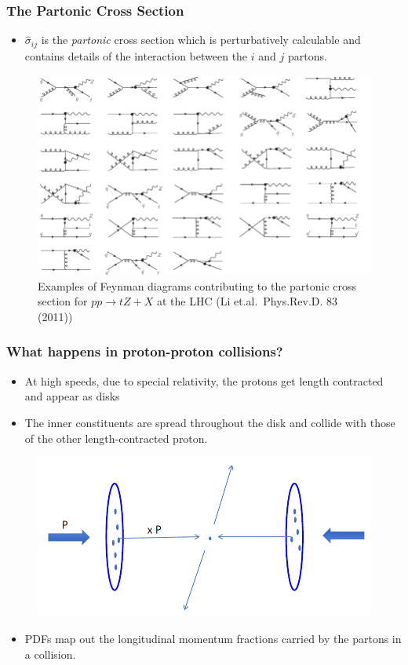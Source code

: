 \documentclass{beamer}
\begin{document}
\begin{frame}
  \frametitle{The Partonic Cross Section}

  \begin{itemize}
  \item $\hat{\sigma}_{ij}$ is the \textit{partonic} cross section which is perturbatively calculable and contains details of the interaction between the $i$ and $j$ partons.
  \end{itemize}

  

  \begin{figure}
    \centering
    \includegraphics[width=0.7\linewidth]{./gfx/feynman-diagrams.png}
    \caption{Examples of Feynman diagrams contributing to the partonic cross section for $pp \rightarrow tZ + X$ at the LHC (Li et.al.~Phys.Rev.D.  83 (2011))}
  \end{figure}
\end{frame}


\begin{frame}
  \frametitle{What happens in proton-proton collisions?}

  \begin{itemize}
  \item At high speeds, due to special relativity, the protons get length contracted and appear as disks
  \item The inner constituents are spread throughout the disk and collide with those of the other length-contracted proton.
  \end{itemize}

  \begin{figure}
    \centering
    \includegraphics[width=0.6\linewidth]{./gfx/colliding-protons.png}
  \end{figure}

  \begin{itemize}
  \item PDFs map out the longitudinal momentum fractions carried by the partons in a collision.
  \end{itemize}
\end{frame}
\end{document}

